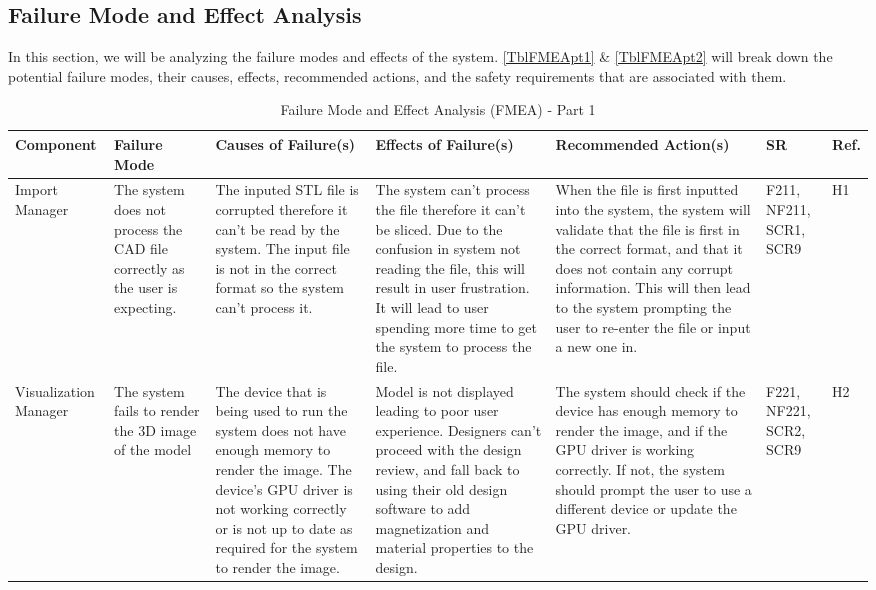 \documentclass{article}
\begin{document}
\begin{landscape}
\section{Failure Mode and Effect Analysis}
In this section, we will be analyzing the failure modes and effects of the system. \autoref{TblFMEApt1} \& \autoref{TblFMEApt2} will break down the potential failure modes, their causes, effects, recommended actions, and the safety requirements that are associated with them.
\begin{table}[H]
\centering
\caption{Failure Mode and Effect Analysis (FMEA) - Part 1}
\label{TblFMEApt1}
\renewcommand{\arraystretch}{1.1} 
\footnotesize 
\begin{tabular}{|p{3cm}|p{3cm}|p{3.8cm}|p{3.8cm}|p{5.5cm}|p{2cm}|p{1cm}|}
\hline
\textbf{Component} & \textbf{Failure Mode} & \textbf{Causes of Failure(s)} & \textbf{Effects of Failure(s)} & \textbf{Recommended Action(s)} & \textbf{SR} & \textbf{Ref.} \\
\hline
Import Manager & The system does not process the CAD file correctly as the user is expecting. & \textbullet{} The inputed STL file is corrupted therefore it can't be read by the system.\newline \textbullet{} The input file is not in the correct format so the system can't process it.& \textbullet{} The system can't process the file therefore it can't be sliced. \newline \textbullet{} Due to the confusion in system not reading the file, this will result in user frustration. \newline \textbullet{} It will lead to user spending more time to get the system to process the file. & When the file is first inputted into the system, the system will validate that the file is first in the correct format, and that it does not contain any corrupt information. This will then lead to the system prompting the user to re-enter the file or input a new one in. & F211, NF211, SCR1, SCR9 & H1 \\
\hline
Visualization Manager & The system fails to render the 3D image of the model & \textbullet{} The device that is being used to run the system does not have enough memory to render the image. \newline \textbullet{} The device's GPU driver is not working correctly or is not up to date as required for the system to render the image. & \textbullet{} Model is not displayed leading to poor user experience. \newline \textbullet{} Designers can't proceed with the design review, and fall back to using their old design software to add magnetization and material properties to the design. & The system should check if the device has enough memory to render the image, and if the GPU driver is working correctly. If not, the system should prompt the user to use a different device or update the GPU driver. & F221, NF221, SCR2, SCR9 & H2 \\

\end{tabular}
\end{table}
\end{landscape}
\end{document}
